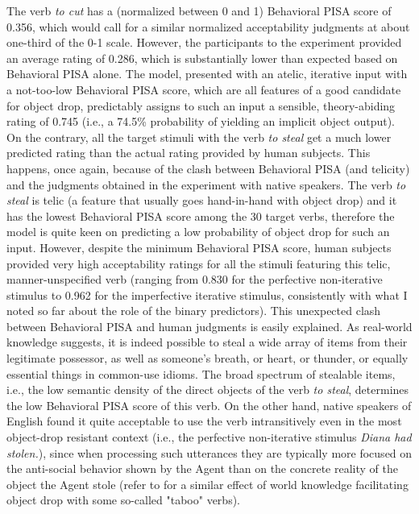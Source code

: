 The verb \textit{to cut} has a (normalized between 0 and 1) Behavioral PISA score of 0.356, which would call for a similar normalized acceptability judgments at about one-third of the 0-1 scale. However, the participants to the experiment provided an average rating of 0.286, which is substantially lower than expected based on Behavioral PISA alone. The model, presented with an atelic, iterative input with a not-too-low Behavioral PISA score, which are all features of a good candidate for object drop, predictably assigns to such an input a sensible, theory-abiding rating of 0.745 (i.e., a 74.5\% probability of yielding an implicit object output).\\ 
On the contrary, all the target stimuli with the verb \textit{to steal} get a much lower predicted rating than the actual rating provided by human subjects. This happens, once again, because of the clash between Behavioral PISA (and telicity) and the judgments obtained in the experiment with native speakers. The verb \textit{to steal} is telic (a feature that usually goes hand-in-hand with object drop) and it has the lowest Behavioral PISA score among the 30 target verbs, therefore the model is quite keen on predicting a low probability of object drop for such an input. However, despite the minimum Behavioral PISA score, human subjects provided very high acceptability ratings for all the stimuli featuring this telic, manner-unspecified verb (ranging from 0.830 for the perfective non-iterative stimulus to 0.962 for the imperfective iterative stimulus, consistently with what I noted so far about the role of the binary predictors). This unexpected clash between Behavioral PISA and human judgments is easily explained. As real-world knowledge suggests, it is indeed possible to steal a wide array of items from their legitimate possessor, as well as someone's breath, or heart, or thunder, or equally essential things in common-use idioms. The broad spectrum of stealable items, i.e., the low semantic density of the direct objects of the verb \textit{to steal}, determines the low Behavioral PISA score of this verb. On the other hand, native speakers of English found it quite acceptable to use the verb intransitively even in the most object-drop resistant context (i.e., the perfective non-iterative stimulus \textit{Diana had stolen.}), since when processing such utterances they are typically more focused on the anti-social behavior shown by the Agent than on the concrete reality of the object the Agent stole (refer to \textcite[21-28]{Goldberg2005} for a similar effect of world knowledge facilitating object drop with some so-called "taboo" verbs). 


